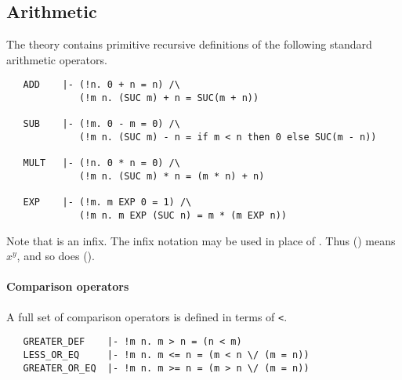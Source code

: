 \subsection{Arithmetic}

The \HOL{} theory  contains primitive recursive
definitions of the following standard arithmetic operators.

\begin{hol}
{\small
\begin{verbatim}
   ADD    |- (!n. 0 + n = n) /\
             (!m n. (SUC m) + n = SUC(m + n))

   SUB    |- (!m. 0 - m = 0) /\
             (!m n. (SUC m) - n = if m < n then 0 else SUC(m - n))

   MULT   |- (!n. 0 * n = 0) /\
             (!m n. (SUC m) * n = (m * n) + n)

   EXP    |- (!m. m EXP 0 = 1) /\
             (!m n. m EXP (SUC n) = m * (m EXP n))
\end{verbatim}
}
\end{hol}
%
Note that  is an infix. The infix notation
\holtxt{**} may be used in place of . Thus
() means $x^y$, and so does ().

\paragraph{Comparison operators}

A full set of comparison operators is defined in terms of \verb+<+.

\begin{hol}
{\small
\begin{verbatim}
   GREATER_DEF    |- !m n. m > n = (n < m)
   LESS_OR_EQ     |- !m n. m <= n = (m < n \/ (m = n))
   GREATER_OR_EQ  |- !m n. m >= n = (m > n \/ (m = n))
\end{verbatim}
}
\end{hol}

